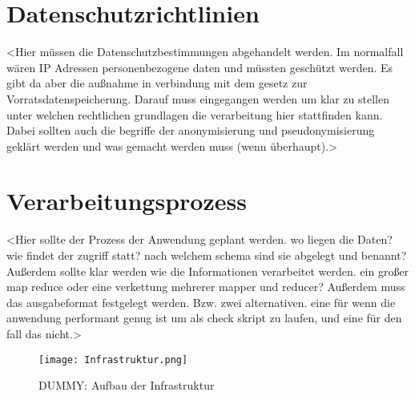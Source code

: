 
\section{Datenschutzrichtlinien}
<Hier müssen die Datenschutzbestimmungen abgehandelt werden. Im normalfall wären IP Adressen personenbezogene daten und müssten geschützt werden. Es gibt da aber die außnahme in verbindung mit dem gesetz zur Vorratsdatenspeicherung. Darauf muss eingegangen werden um klar zu stellen unter welchen rechtlichen grundlagen die verarbeitung hier stattfinden kann. Dabei sollten auch die begriffe der anonymisierung und pseudonymisierung geklärt werden und was gemacht werden muss (wenn überhaupt).>

\section{Verarbeitungsprozess}
<Hier sollte der Prozess der Anwendung geplant werden. wo liegen die Daten? wie findet der zugriff statt? nach welchem schema sind sie abgelegt und benannt? Außerdem sollte klar werden wie die Informationen verarbeitet werden. ein großer map reduce oder eine verkettung mehrerer mapper und reducer? Außerdem muss das ausgabeformat festgelegt werden. Bzw. zwei alternativen. eine für wenn die anwendung performant genug ist um als check skript zu laufen, und eine für den fall das nicht.>

\begin{figure}
	\centering
	\texttt{[image: Infrastruktur.png]}
	\caption{DUMMY: Aufbau der Infrastruktur}
	\label{fig:AufbauInfrastruktur}
\end{figure}